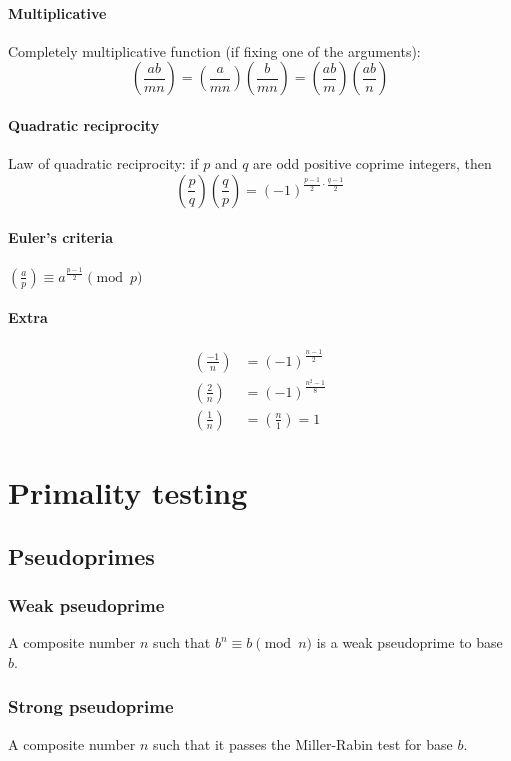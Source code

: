 \documentclass{article}
\begin{document}
\paragraph{Multiplicative}
Completely multiplicative function (if fixing one of the arguments):\\
$$(\frac{ab}{mn}) = (\frac{a}{mn})(\frac{b}{mn}) = (\frac{ab}{m})(\frac{ab}{n})$$
\paragraph{Quadratic reciprocity}
Law of quadratic reciprocity: if $p$ and $q$ are odd positive coprime integers, then
$$(\frac{p}{q})(\frac{q}{p}) = (-1)^{\frac{p-1}{2}⋅\frac{q-1}{2}}$$
\paragraph{Euler's criteria}
${(\frac{a}{p} )}  ≡ a^{\frac{p-1}{2}} \pmod p$
\paragraph{Extra}
\begin{align*}
{(\frac{-1}{n})}  &= (-1)^{\frac{n-1}{2}}\\[.2cm]
{(\frac{2}{n} )}  &= (-1)^{\frac{n^2-1}{8}}\\[.2cm]
{(\frac{1}{n} )}  &= (\frac{n}{1}) = 1
\end{align*}

\section{Primality testing}

\subsection{Pseudoprimes}

\subsubsection{Weak pseudoprime}
A composite number $n$ such that $b^n ≡ b \pmod n$ is a weak pseudoprime to base $b$.

\subsubsection{Strong pseudoprime}
A composite number $n$ such that it passes the Miller-Rabin test for base $b$.
\end{document}
